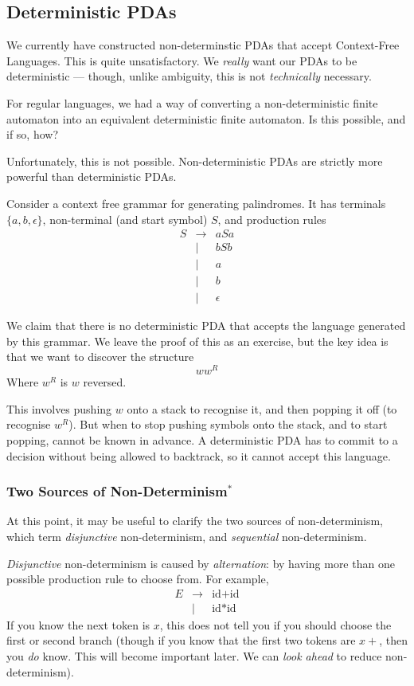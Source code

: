 \subsection{Deterministic PDAs}
We currently have constructed non-determinstic PDAs that accept Context-Free Languages. This is quite unsatisfactory. We \textit{really} want our PDAs to be deterministic --- though, unlike ambiguity, this is not \textit{technically} necessary.

For regular languages, we had a way of converting a non-deterministic finite automaton into an equivalent deterministic finite automaton. Is this possible, and if so, how?

Unfortunately, this is not possible. Non-deterministic PDAs are strictly more powerful than deterministic PDAs. 

Consider a context free grammar for generating palindromes. It has terminals $\{a, b, \epsilon \}$, non-terminal (and start symbol) $S$, and production rules
\[\begin{array}{rcl}
     S & \rightarrow & aSa  \\
     & \mid & bSb \\
     & \mid & a \\
     & \mid & b \\
     & \mid & \epsilon
\end{array}\]

We claim that there is no deterministic PDA that accepts the language generated by this grammar. We leave the proof of this as an exercise, but the key idea is that we want to discover the structure 
\[ w w^R\] 
Where $w^R$ is $w$ reversed.

This involves pushing $w$ onto a stack to recognise it, and then popping it off (to recognise $w^R$). But when to stop pushing symbols onto the stack, and to start popping, cannot be known in advance. A deterministic PDA has to commit to a decision without being allowed to backtrack, so it cannot accept this language. 

\subsubsection{Two Sources of Non-Determinism$^*$}
At this point, it may be useful to clarify the two sources of non-determinism, which \citet{krishnaswami-2019} term \textit{disjunctive} non-determinism, and \textit{sequential} non-determinism. 

\textit{Disjunctive} non-determinism is caused by \textit{alternation}: by having more than one possible production rule to choose from. For example, 
\[\begin{array}{rcl}
     E&\to&\text{id}+\text{id}  \\
      &\mid&\text{id}*\text{id}
\end{array}\]
If you know the next token is $x$, this does not tell you if you should choose the first or second branch (though if you know that the first two tokens are $x+$, then you \textit{do} know. This will become important later. We can \textit{look ahead} to reduce non-determinism).

